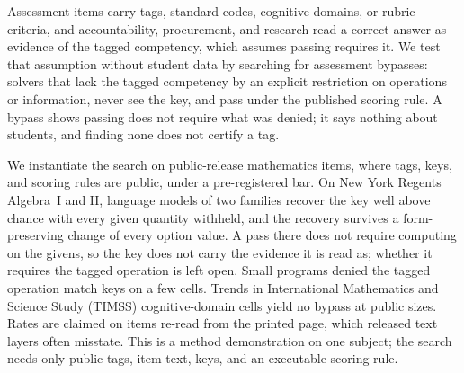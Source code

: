 Assessment items carry tags, standard codes, cognitive domains, or
rubric criteria, and accountability, procurement, and research read a
correct answer as evidence of the tagged competency, which assumes
passing requires it. We test that assumption without student data by
searching for assessment bypasses: solvers that lack the tagged
competency by an explicit restriction on operations or information,
never see the key, and pass under the published scoring rule. A bypass
shows passing does not require what was denied; it says nothing about
students, and finding none does not certify a tag.

We instantiate the search on public-release mathematics items, where
tags, keys, and scoring rules are public, under a pre-registered bar.
On New York Regents Algebra~I and II, language models of two families
recover the key well above chance with every given quantity withheld,
and the recovery survives a form-preserving change of every option
value. A pass there does not require computing on the givens, so the
key does not carry the evidence it is read as; whether it requires the
tagged operation is left open. Small programs denied the tagged
operation match keys on a few cells. Trends in International
Mathematics and Science Study (TIMSS) cognitive-domain cells yield no
bypass at public sizes. Rates are claimed on items re-read from the
printed page, which released text layers often misstate. This is a
method demonstration on one subject; the search needs only public tags,
item text, keys, and an executable scoring rule.
